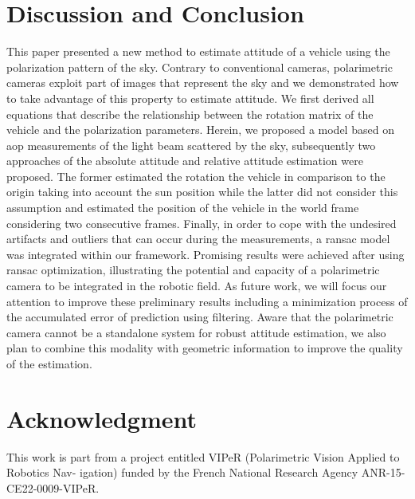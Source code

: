 \section{Discussion and Conclusion}
\label{sec:dis-con}

This paper presented a new method to estimate attitude of a vehicle using the
polarization pattern of the sky. Contrary to conventional cameras,
polarimetric cameras exploit part of images that represent the sky and we
demonstrated how to take advantage of this property to estimate
attitude. We first derived all equations that describe the relationship between
the rotation matrix of the vehicle and the polarization parameters.
Herein, we proposed a model based on \gls{aop} measurements of the light beam
scattered by the sky, subsequently two approaches of the absolute attitude and
relative attitude estimation were proposed. The former estimated the rotation
the vehicle in comparison to the origin taking into account the sun position
while the latter did not consider this assumption and estimated the position of
the vehicle in the world frame considering two consecutive frames.
Finally, in order to cope with the undesired artifacts and outliers that can
occur during the measurements, a \gls{ransac} model was integrated within our
framework. Promising results were achieved after using \gls{ransac} optimization,
illustrating the potential and capacity of a polarimetric camera to be
integrated in the robotic field. As future work, we will focus our attention
to improve these preliminary results including a minimization process of the
accumulated error of prediction using filtering. Aware that the polarimetric
camera cannot be a standalone system for robust attitude estimation, we also
plan to combine this modality with geometric information to improve the quality
of the estimation.

\section{Acknowledgment}
\label{sec:ack}
This work is part from a project entitled VIPeR (Polarimetric Vision Applied to Robotics Nav-
igation) funded by the French National Research Agency ANR-15-CE22-0009-VIPeR.


